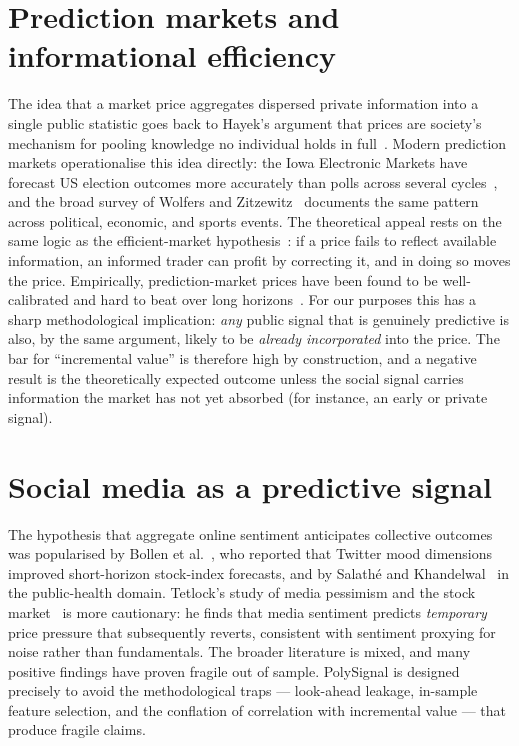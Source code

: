 \section{Prediction markets and informational efficiency}
The idea that a market price aggregates dispersed private information into a single
public statistic goes back to Hayek's argument that prices are society's mechanism for
pooling knowledge no individual holds in full~\cite{hayek1945use}. Modern prediction
markets operationalise this idea directly: the Iowa Electronic Markets have forecast
US election outcomes more accurately than polls across several
cycles~\cite{berg2008prediction}, and the broad survey of
Wolfers and Zitzewitz~\cite{wolfers2004prediction} documents the same pattern across
political, economic, and sports events. The theoretical appeal rests on the same
logic as the efficient-market hypothesis~\cite{fama1970efficient}: if a price fails to
reflect available information, an informed trader can profit by correcting it, and in
doing so moves the price. Empirically, prediction-market prices have been found to be
well-calibrated and hard to beat over long horizons~\cite{wolfers2004prediction,
berg2008prediction}. For our purposes this has a sharp methodological implication:
\emph{any} public signal that is genuinely predictive is also, by the same argument,
likely to be \emph{already incorporated} into the price. The bar for ``incremental
value'' is therefore high by construction, and a negative result is the theoretically
expected outcome unless the social signal carries information the market has not yet
absorbed (for instance, an early or private signal).

\section{Social media as a predictive signal}
The hypothesis that aggregate online sentiment anticipates collective outcomes was
popularised by Bollen et al.~\cite{bollen2011twitter}, who reported that Twitter mood
dimensions improved short-horizon stock-index forecasts, and by Salath\'e and
Khandelwal~\cite{salathe2012assessing} in the public-health domain. Tetlock's study
of media pessimism and the stock market~\cite{tetlock2007giving} is more cautionary:
he finds that media sentiment predicts \emph{temporary} price pressure that
subsequently reverts, consistent with sentiment proxying for noise rather than
fundamentals. The broader literature is mixed, and many positive findings have proven
fragile out of sample. PolySignal is designed precisely to avoid the methodological
traps --- look-ahead leakage, in-sample feature selection, and the conflation of
correlation with incremental value --- that produce fragile claims.

